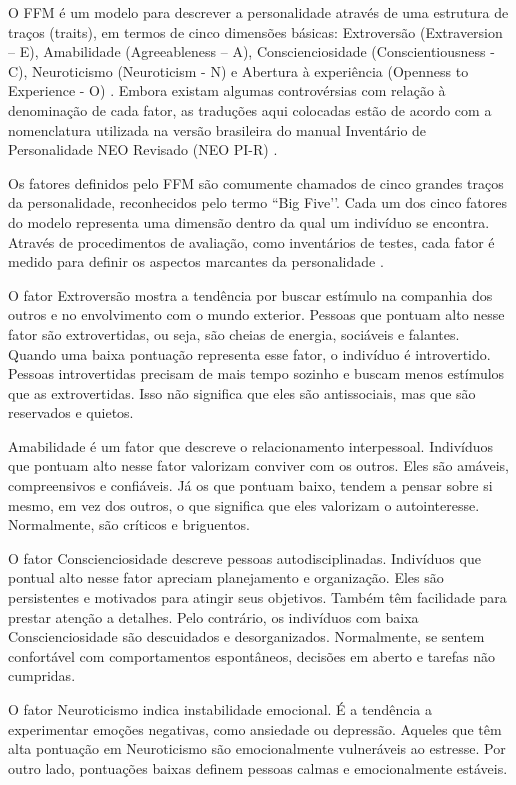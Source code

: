 O FFM é um modelo para descrever a personalidade através de uma estrutura de traços (traits), em termos de cinco dimensões básicas: Extroversão (Extraversion – E), Amabilidade (Agreeableness – A), Conscienciosidade (Conscientiousness - C), Neuroticismo (Neuroticism - N) e Abertura à experiência (Openness to Experience - O) \cite{mccrae:92}. Embora  existam  algumas  controvérsias com relação à denominação de cada fator, as traduções aqui colocadas estão de acordo com a nomenclatura utilizada na versão brasileira do manual Inventário de Personalidade NEO Revisado (NEO PI-R) \cite{flores:07}.

Os fatores definidos pelo FFM são comumente chamados de cinco grandes traços da personalidade, reconhecidos pelo termo ``Big Five’’. Cada um dos cinco fatores do modelo representa uma dimensão dentro da qual um indivíduo se encontra. Através de procedimentos de avaliação, como inventários de testes, cada fator é medido para definir os aspectos marcantes da personalidade \cite{costa:92b}.

O fator Extroversão mostra a tendência por buscar estímulo na companhia dos outros e no envolvimento com o mundo exterior. Pessoas que pontuam alto nesse fator são extrovertidas, ou seja, são cheias de energia, sociáveis e falantes. Quando uma baixa pontuação representa esse fator, o indivíduo é introvertido. Pessoas introvertidas precisam de mais tempo sozinho e buscam menos estímulos que as extrovertidas. Isso não significa que eles são antissociais, mas que são reservados e quietos.

Amabilidade é um fator que descreve o relacionamento interpessoal. Indivíduos que pontuam alto nesse fator valorizam conviver com os outros. Eles são amáveis, compreensivos e confiáveis. Já os que pontuam baixo, tendem a pensar sobre si mesmo, em vez dos outros, o que significa que eles valorizam o autointeresse. Normalmente, são críticos e briguentos.

O fator Conscienciosidade descreve pessoas autodisciplinadas. Indivíduos que pontual alto nesse fator apreciam planejamento e organização. Eles são persistentes e motivados para atingir seus objetivos. Também têm facilidade para prestar atenção a detalhes. Pelo contrário, os indivíduos com baixa Conscienciosidade são descuidados e desorganizados. Normalmente, se sentem confortável com comportamentos espontâneos, decisões em aberto e tarefas não cumpridas.

O fator Neuroticismo indica instabilidade emocional. É a tendência a experimentar emoções negativas, como ansiedade ou depressão. Aqueles que têm alta pontuação em Neuroticismo são emocionalmente vulneráveis ao estresse. Por outro lado, pontuações baixas definem pessoas calmas e emocionalmente estáveis.

